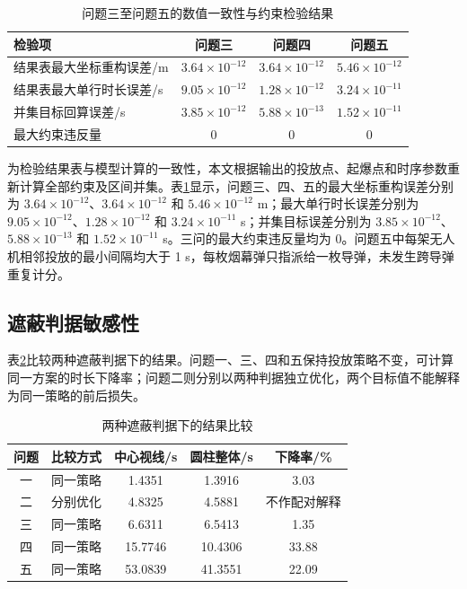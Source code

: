 \documentclass[UTF8,a4paper,12pt,fontset=windows]{ctexart}
\newcommand{\thead}[1]{{\bfseries\boldmath #1}}
\begin{document}
\begin{table}[!htbp]
\centering
\caption{问题三至问题五的数值一致性与约束检验结果}
\label{tab:numerical-audit}
\small
\begin{tabular}{lccc}
\toprule
\thead{检验项} & \thead{问题三} & \thead{问题四} & \thead{问题五}\\
\midrule
结果表最大坐标重构误差/m & $3.64\times10^{-12}$ & $3.64\times10^{-12}$ & $5.46\times10^{-12}$\\
结果表最大单行时长误差/s & $9.05\times10^{-12}$ & $1.28\times10^{-12}$ & $3.24\times10^{-11}$\\
并集目标回算误差/s & $3.85\times10^{-12}$ & $5.88\times10^{-13}$ & $1.52\times10^{-11}$\\
最大约束违反量 & 0 & 0 & 0\\
\bottomrule
\end{tabular}
\end{table}

为检验结果表与模型计算的一致性，本文根据输出的投放点、起爆点和时序参数重新计算全部约束及区间并集。表\ref{tab:numerical-audit}显示，问题三、四、五的最大坐标重构误差分别为 $3.64\times10^{-12}$、$3.64\times10^{-12}$ 和 $5.46\times10^{-12}$ m；最大单行时长误差分别为 $9.05\times10^{-12}$、$1.28\times10^{-12}$ 和 $3.24\times10^{-11}$ s；并集目标误差分别为 $3.85\times10^{-12}$、$5.88\times10^{-13}$ 和 $1.52\times10^{-11}$ s。三问的最大约束违反量均为 0。问题五中每架无人机相邻投放的最小间隔均大于 1 s，每枚烟幕弹只指派给一枚导弹，未发生跨导弹重复计分。

\subsection{遮蔽判据敏感性}

表\ref{tab:criterion-sensitivity}比较两种遮蔽判据下的结果。问题一、三、四和五保持投放策略不变，可计算同一方案的时长下降率；问题二则分别以两种判据独立优化，两个目标值不能解释为同一策略的前后损失。

\begin{table}[!htbp]
\centering
\caption{两种遮蔽判据下的结果比较}
\label{tab:criterion-sensitivity}
\small
\begin{tabular}{ccccc}
\toprule
\thead{问题} & \thead{比较方式} & \thead{中心视线/s} & \thead{圆柱整体/s} & \thead{下降率/\%}\\
\midrule
一 & 同一策略 & 1.4351 & 1.3916 & 3.03\\
二 & 分别优化 & 4.8325 & 4.5881 & 不作配对解释\\
三 & 同一策略 & 6.6311 & 6.5413 & 1.35\\
四 & 同一策略 & 15.7746 & 10.4306 & 33.88\\
五 & 同一策略 & 53.0839 & 41.3551 & 22.09\\
\bottomrule
\end{tabular}
\end{table}
\end{document}
